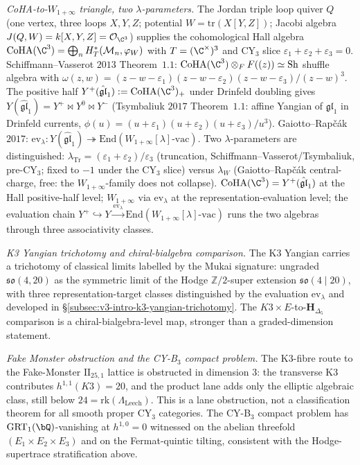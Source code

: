\textsl{CoHA-to-\(W_{1+\infty}\) triangle, two \(\lambda\)-parameters.}\enspace
The Jordan triple loop quiver \(Q\) (one vertex, three loops
\(X,Y,Z\); potential \(W=\mathrm{tr}(X[Y,Z])\); Jacobi algebra
\(J(Q,W)=k[X,Y,Z]=\cO_{\C^3}\)) supplies the cohomological Hall
algebra \(\CoHA(\C^3) = \bigoplus_n H^{\ast}_T(\cM_n,\varphi_W)\)
with \(T=(\C^\times)^3\) and CY$_3$ slice
\(\varepsilon_1+\varepsilon_2+\varepsilon_3=0\). Schiffmann--Vasserot
$2013$ Theorem~$1.1$: \(\CoHA(\C^3)\otimes_F F((z)) \simeq \mathrm{Sh}\)
shuffle algebra with
\(\omega(z,w)=(z-w-\varepsilon_1)(z-w-\varepsilon_2)(z-w-\varepsilon_3)/(z-w)^3\).
The positive half \(Y^+(\hat{\mathfrak{gl}}_1) := \CoHA(\C^3)_+\)
under Drinfeld doubling gives
\(Y(\hat{\mathfrak{gl}}_1) = Y^+\bowtie Y^0\bowtie Y^-\)
(Tsymbaliuk $2017$ Theorem~$1.1$: affine Yangian of
\(\mathfrak{gl}_1\) in Drinfeld currents,
\(\phi(u)=(u+\varepsilon_1)(u+\varepsilon_2)(u+\varepsilon_3)/u^3\)).
Gaiotto--Rap\v c\'ak $2017$: \(\mathrm{ev}_\lambda\colon
Y(\hat{\mathfrak{gl}}_1)\twoheadrightarrow\mathrm{End}(W_{1+\infty}[\lambda]\text{-vac})\).
Two \(\lambda\)-parameters are distinguished: \(\lambda_{\mathrm{Tr}}=
(\varepsilon_1+\varepsilon_2)/\varepsilon_3\) (truncation,
Schiffmann--Vasserot/Tsymbaliuk, pre-CY$_3$; fixed to \(-1\) under
the CY$_3$ slice) versus \(\lambda_W\) (Gaiotto--Rap\v c\'ak
central-charge, free: the \(W_{1+\infty}\)-family does not collapse).
$\CoHA(\C^3) = Y^+(\hat{\mathfrak{gl}}_1)$ at the Hall positive-half
level; $W_{1 + \infty}$ via $\mathrm{ev}_\lambda$ at the
representation-evaluation level; the evaluation chain
$Y^+ \hookrightarrow Y \xrightarrow{\mathrm{ev}_\lambda} \mathrm{End}(W_{1 + \infty}[\lambda]\text{-vac})$
runs the two algebras through three associativity classes.

\textsl{K3 Yangian trichotomy and chiral-bialgebra comparison.}\enspace
The K3 Yangian carries a trichotomy of classical limits labelled by
the Mukai signature: ungraded \(\mathfrak{so}(4,20)\) as the symmetric
limit of the Hodge $\mathbb{Z}/2$-super extension
\(\mathfrak{so}(4\mid 20)\), with three representation-target classes
distinguished by the evaluation \(\mathrm{ev}_\lambda\) and developed in
\S\ref{subsec:v3-intro-k3-yangian-trichotomy}. The
\(K3\times E\)-to-\(\mathbf H_{\Delta_5}\) comparison is a
chiral-bialgebra-level map, stronger than a graded-dimension statement.

\textsl{Fake Monster obstruction and the CY-B$_3$ compact problem.}\enspace
The K3-fibre route to the Fake-Monster
\(\mathrm{II}_{25,1}\) lattice is obstructed in dimension \(3\): the
transverse K3 contributes \(h^{1,1}(K3)=20\), and the product lane adds
only the elliptic algebraic class, still below
\(24=\mathrm{rk}(\Lambda_{\mathrm{Leech}})\). This is a lane
obstruction, not a classification theorem for all smooth proper
CY$_3$ categories. The CY-B$_3$ compact problem has $\mathrm{GRT}_1(\bQ)$-vanishing
at $h^{1,0}=0$ witnessed on the abelian threefold
$(E_1\times E_2\times E_3)$ and on the Fermat-quintic tilting,
consistent with the Hodge-supertrace stratification above.


